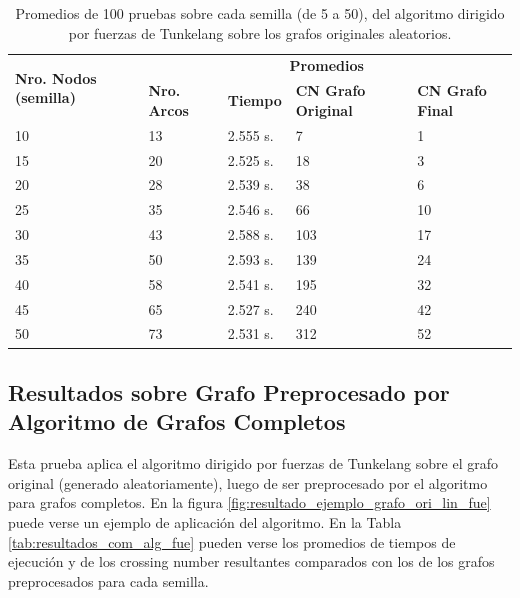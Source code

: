 \begin{table}[H]
	\caption{Promedios de 100 pruebas sobre cada semilla (de 5 a 50), del algoritmo dirigido por fuerzas de Tunkelang sobre los grafos originales aleatorios.}
	\label{tab:resultados_orig_alg_fue}
	\begin{tabularx}{\linewidth}{|p{1.5cm}|p{1.2cm}|p{1.5cm}|X|X|}
		\hline
		\multirow{2}{2cm}{\textbf{Nro. Nodos (semilla)}} & \multicolumn{4}{c|}{\textbf{Promedios}} \\
		\cline{2-5}
		& \textbf{Nro. Arcos} & \textbf{Tiempo} & \textbf{CN Grafo Original} & \textbf{CN Grafo Final} \\
		\hline
		10 & 13 & 2.555 s. & 7 & 1 \\
		\hline
		15 & 20 & 2.525 s. & 18 & 3 \\
		\hline
		20 & 28 & 2.539 s. & 38 & 6 \\
		\hline
		25 & 35 & 2.546 s. & 66 & 10 \\
		\hline
		30 & 43 & 2.588 s. & 103 & 17 \\
		\hline
		35 & 50 & 2.593 s. & 139 & 24 \\
		\hline
		40 & 58 & 2.541 s. & 195 & 32 \\
		\hline
		45 & 65 & 2.527 s. & 240 & 42 \\
		\hline
		50 & 73 & 2.531 s. & 312 & 52 \\
		\hline
	\end{tabularx}
\end{table}

\subsection{Resultados sobre Grafo Preprocesado por Algoritmo de Grafos Completos}
Esta prueba aplica el algoritmo dirigido por fuerzas de Tunkelang sobre el grafo original (generado aleatoriamente), luego de ser preprocesado por el algoritmo para grafos completos. En la figura \ref{fig:resultado_ejemplo_grafo_ori_lin_fue} puede verse un ejemplo de aplicación del algoritmo. En la Tabla \ref{tab:resultados_com_alg_fue} pueden verse los promedios de tiempos de ejecución y de los crossing number resultantes comparados con los de los grafos preprocesados para cada semilla.

